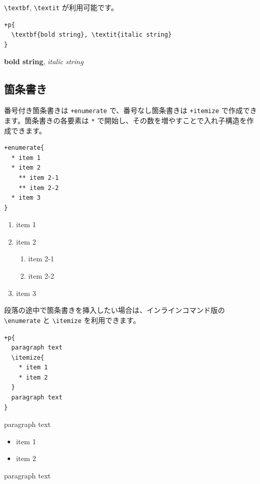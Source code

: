 \verb$\textbf$, \verb$\textit$ が利用可能です。

\begin{lstlisting}
+p{
  \textbf{bold string}, \textit{italic string}
}
\end{lstlisting}

\begin{oframed}
  
  \textbf{bold string}, \textit{italic string}
\end{oframed}

\subsection{箇条書き}

番号付き箇条書きは \verb$+enumerate$ で、番号なし箇条書きは \verb$+itemize$ で作成できます。箇条書きの各要素は \verb$*$ で開始し、その数を増やすことで入れ子構造を作成できます。

\begin{lstlisting}
+enumerate{
  * item 1
  * item 2
    ** item 2-1
    ** item 2-2
  * item 3
}
\end{lstlisting}

\begin{oframed}
  
  
  \begin{enumerate}
    \item item 1
    \item item 2
    \begin{enumerate}
      \item item 2-1
      \item item 2-2
    \end{enumerate}
    \item item 3
  \end{enumerate}
\end{oframed}

段落の途中で箇条書きを挿入したい場合は、インラインコマンド版の \verb$\enumerate$ と \verb$\itemize$ を利用できます。

\begin{lstlisting}
+p{
  paragraph text
  \itemize{
    * item 1
    * item 2
  }
  paragraph text
}
\end{lstlisting}

\begin{oframed}
  
  paragraph text
  
  \begin{itemize}
    \item item 1
    \item item 2
  \end{itemize}
  
  paragraph text
\end{oframed}

